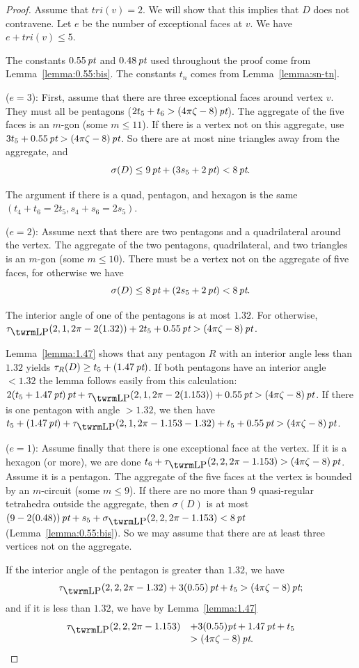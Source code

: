 \begin{proof}
Assume that $tri(v)=2$.  We will show that this implies that $D$
does not contravene.  Let $e$ be the number of exceptional faces
at $v$.  We have $e+tri(v)\le5$.

The constants $0.55\,\hbox{\it pt}$ and $0.48\,\hbox{\it pt}$ used throughout the
proof come from Lemma~\ref{lemma:0.55:bis}. The constants $t_n$
comes from Lemma~\ref{lemma:sn-tn}.

($e=3$): First, assume that there are three exceptional faces
around vertex $v$. They must all be pentagons
($2t_5+t_6>(4\pi\zeta-8)\,\hbox{\it pt}$). The aggregate of the five faces is an
$m$-gon (some $m\le11$).  If there is a vertex not on this
aggregate, use $3t_5+0.55\,\hbox{\it pt}>(4\pi\zeta-8)\,\hbox{\it pt}$. So there are at most
nine triangles away from the aggregate, and
    $$
    \sigma(D) \le 9\,\hbox{\it pt} + (3 s_5+2\,\hbox{\it pt}) < 8\,\hbox{\it pt}.
    $$

The argument if there is a quad, pentagon, and hexagon is the same
$(t_4+t_6=2t_5,s_4+s_6=2s_5)$.

($e=2$): Assume next that there are two pentagons and a
quadrilateral around the vertex. The aggregate of the two
pentagons, quadrilateral, and two triangles is an $m$-gon (some
$m\le10$). There must be a vertex not on the aggregate of five
faces, for otherwise we have
    $$
    \sigma(D) \le 8\,\hbox{\it pt}+(2s_5+2\,\hbox{\it pt})<8\,\hbox{\it pt}.
    $$

The interior angle of one of the pentagons is at most $1.32$.  For
otherwise, $\tauLP(2,1,2\pi-2(1.32))+2t_5+0.55\,\pt>\squander$.

Lemma~\ref{lemma:1.47} shows that any pentagon $R$ with an
interior angle less than $1.32$ yields $\tau_R(D)\ge t_5+
(1.47\,\hbox{\it pt})$. If both pentagons have an interior angle $<1.32$ the
lemma follows easily from this calculation:
    $2(t_5+1.47\,\pt)\,\pt+\tauLP(2,1,2\pi-2(1.153))+0.55\,\pt>\squander$.
If there is one pentagon with angle $>1.32$, we then have
    $t_5+(1.47\,\pt)+\tauLP(2,1,2\pi-1.153-1.32)+t_5+0.55\,\pt>\squander$.


($e=1$): Assume finally that there is one exceptional face at the
vertex. If it is a hexagon (or more), we are done
$t_6+\tauLP(2,2,2\pi-1.153)>\squander$. Assume it is a pentagon. The
aggregate of the five faces at the vertex is bounded by an
$m$-circuit (some $m\le9$). If there are no more than $9$
quasi-regular tetrahedra outside the aggregate, then $\sigma(D)$ is
at most $(9-2(0.48))\,\pt+s_5+\sLP(2,2,2\pi-1.153)<8\,\pt$
(Lemma~\ref{lemma:0.55:bis}). So we may assume that there are at
least three vertices not on the aggregate.

If the interior angle of the pentagon is greater than $1.32$, we
have
$$\tauLP(2,2,2\pi-1.32) +3(0.55)\,\pt +t_5 > \squander;$$
and if it is less than $1.32$, we have by Lemma~\ref{lemma:1.47}
    $$
    \begin{array}{lll}
        \tauLP(2,2,2\pi-1.153)&+3(0.55)\pt+1.47\,\pt+t_5 \\
            &> \squander.
    \end{array}
    $$
\end{proof}

